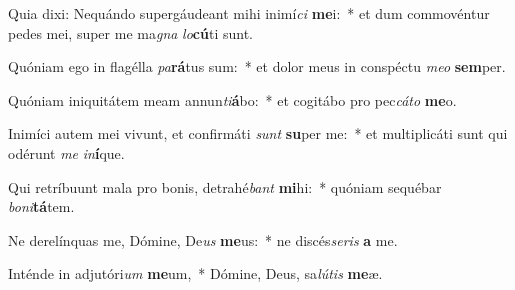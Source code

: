 \item Quia dixi: Nequándo supergáudeant mihi inimí\textit{ci} \textbf{me}i:~* et dum commovéntur pedes mei, super me ma\textit{gna} \textit{lo}\textbf{cú}ti sunt.
\item Quóniam ego in flagélla \textit{pa}\textbf{rá}tus sum:~* et dolor meus in conspéctu \textit{me}\textit{o} \textbf{sem}per.
\item Quóniam iniquitátem meam annun\textit{ti}\textbf{á}bo:~* et cogitábo pro pec\textit{cá}\textit{to} \textbf{me}o.
\item Inimíci autem mei vivunt, et confirmáti \textit{sunt} \textbf{su}per me:~* et multiplicáti sunt qui odérunt \textit{me} \textit{in}\textbf{í}que.
\item Qui retríbuunt mala pro bonis, detrahé\textit{bant} \textbf{mi}hi:~* quóniam sequébar \textit{bo}\textit{ni}\textbf{tá}tem.
\item Ne derelínquas me, Dómine, De\textit{us} \textbf{me}us:~* ne discés\textit{se}\textit{ris} \textbf{a} me.
\item Inténde in adjutóri\textit{um} \textbf{me}um,~* Dómine, Deus, sa\textit{lú}\textit{tis} \textbf{me}æ.
